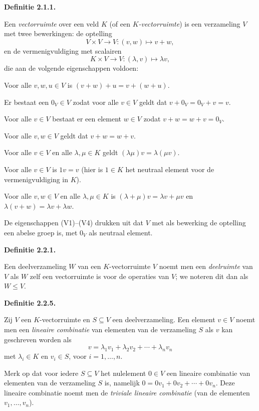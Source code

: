 \documentclass[10pt,a4paper]{article}
\newenvironment{res}[1]{%
  \par\noindent\textbf{Definitie #1.}~\ignorespaces
}{%
  \par\vspace{2pt}\normalfont
}
\begin{document}
\begin{res}{2.1.1}
Een \textit{vectorruimte} over een veld $K$ (of een \textit{$K$-vectorruimte}) is een verzameling $V$ met twee bewerkingen: de optelling
\[
V\times V\to V:(v,w)\mapsto v+w,
\]
en de vermenigvuldiging met scalairen
\[
K\times V\to V:(\lambda,v)\mapsto\lambda v,
\]
die aan de volgende eigenschappen voldoen:
\begin{description}[leftmargin=2.6em,itemsep=1pt,topsep=1pt,font=\normalfont\bfseries]
\item[(V1)] Voor alle $v,w,u\in V$ is $(v+w)+u=v+(w+u)$.
\item[(V2)] Er bestaat een $0_V\in V$ zodat voor alle $v\in V$ geldt dat $v+0_V=0_V+v=v$.
\item[(V3)] Voor alle $v\in V$ bestaat er een element $w\in V$ zodat $v+w=w+v=0_V$.
\item[(V4)] Voor alle $v,w\in V$ geldt dat $v+w=w+v$.
\item[(V5)] Voor alle $v\in V$ en alle $\lambda,\mu\in K$ geldt $(\lambda\mu)v=\lambda(\mu v)$.
\item[(V6)] Voor alle $v\in V$ is $1v=v$ (hier is $1\in K$ het neutraal element voor de vermenigvuldiging in $K$).
\item[(V7)] Voor alle $v,w\in V$ en alle $\lambda,\mu\in K$ is $(\lambda+\mu)v=\lambda v+\mu v$ en $\lambda(v+w)=\lambda v+\lambda w$.
\end{description}
De eigenschappen (V1)--(V4) drukken uit dat $V$ met als bewerking de optelling een abelse groep is, met $0_V$ als neutraal element.
\end{res}

\begin{res}{2.2.1}
Een deelverzameling $W$ van een $K$-vectorruimte $V$ noemt men een \textit{deelruimte} van $V$ als $W$ zelf een vectorruimte is voor de operaties van $V$; we noteren dit dan als $W\le V$.
\end{res}

\begin{res}{2.2.5}
Zij $V$ een $K$-vectorruimte en $S\subseteq V$ een deelverzameling. Een element $v\in V$ noemt men een \textit{lineaire combinatie} van elementen van de verzameling $S$ als $v$ kan geschreven worden als
\[
v=\lambda_1v_1+\lambda_2v_2+\cdots+\lambda_nv_n
\]
met $\lambda_i\in K$ en $v_i\in S$, voor $i=1,\dots,n$.

Merk op dat voor iedere $S\subseteq V$ het nulelement $0\in V$ een lineaire combinatie van elementen van de verzameling $S$ is, namelijk $0=0v_1+0v_2+\cdots+0v_n$. Deze lineaire combinatie noemt men de \textit{triviale lineaire combinatie} (van de elementen $v_1,\dots,v_n$).
\end{res}
\end{document}
